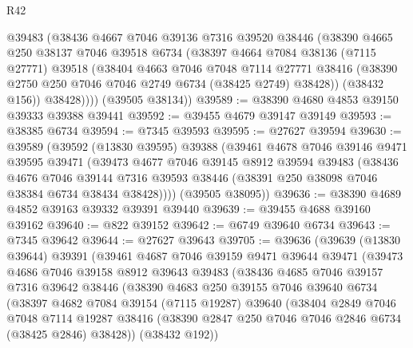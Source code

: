 \begin{lexlean}{R42}
\begin{coremodule}
{          @39483
          (@38436
            @4667
            @7046
            @39136
            @7316
            @39520
            @38446
            (@38390
              @4665
              @250
              @38137
              @7046
              @39518
              @6734
              (@38397
                @4664
                @7084
                @38136
                (@7115 @27771)
                @39518
                (@38404
                  @4663
                  @7046
                  @7048
                  @7114
                  @27771
                  @38416
                  (@38390 @2750 @250 @7046 @7046 @2749 @6734 (@38425 @2749) @38428))
                (@38432 @156))
              @38428))))
      (@39505 @38134))
@39589 := @38390 @4680 @4853 @39150 @39333 @39388 @39441
@39592 := @39455 @4679 @39147 @39149
@39593 := @38385 @6734
@39594 := @7345 @39593
@39595 := @27627 @39594
@39630 := @39589
    (@39592
      (@13830 @39595)
      @39388
      (@39461
        @4678
        @7046
        @39146
        @9471
        @39595
        @39471
        (@39473
          @4677
          @7046
          @39145
          @8912
          @39594
          @39483
          (@38436
            @4676
            @7046
            @39144
            @7316
            @39593
            @38446
            (@38391 @250 @38098 @7046 @38384 @6734 @38434 @38428))))
      (@39505 @38095))
@39636 := @38390 @4689 @4852 @39163 @39332 @39391 @39440
@39639 := @39455 @4688 @39160 @39162
@39640 := @822 @39152
@39642 := @6749 @39640 @6734
@39643 := @7345 @39642
@39644 := @27627 @39643
@39705 := @39636
    (@39639
      (@13830 @39644)
      @39391
      (@39461
        @4687
        @7046
        @39159
        @9471
        @39644
        @39471
        (@39473
          @4686
          @7046
          @39158
          @8912
          @39643
          @39483
          (@38436
            @4685
            @7046
            @39157
            @7316
            @39642
            @38446
            (@38390
              @4683
              @250
              @39155
              @7046
              @39640
              @6734
              (@38397
                @4682
                @7084
                @39154
                (@7115 @19287)
                @39640
                (@38404
                  @2849
                  @7046
                  @7048
                  @7114
                  @19287
                  @38416
                  (@38390 @2847 @250 @7046 @7046 @2846 @6734 (@38425 @2846) @38428))
                (@38432 @192))
}
\end{coremodule}
\end{lexlean}
